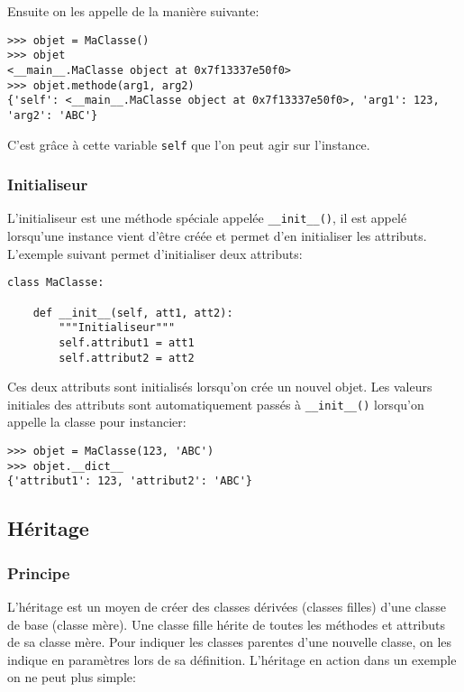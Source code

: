 Ensuite on les appelle de la manière suivante:
\begin{verbatim}
>>> objet = MaClasse()
>>> objet
<__main__.MaClasse object at 0x7f13337e50f0>
>>> objet.methode(arg1, arg2)
{'self': <__main__.MaClasse object at 0x7f13337e50f0>, 'arg1': 123, 'arg2': 'ABC'}
\end{verbatim}

C'est grâce à cette variable \texttt{self} que l'on peut agir sur l'instance.

\subsubsection{Initialiseur}

L'initialiseur est une méthode spéciale appelée \texttt{__init__()}, il est appelé lorsqu'une instance vient
d'être créée et permet d'en initialiser les attributs. L'exemple suivant permet d'initialiser deux attributs:

\begin{verbatim}
class MaClasse:

    def __init__(self, att1, att2):
        """Initialiseur"""
        self.attribut1 = att1
        self.attribut2 = att2
\end{verbatim}

Ces deux attributs sont initialisés lorsqu'on crée un nouvel objet. Les valeurs initiales des attributs sont automa\-tiquement 
passés à \texttt{__init__()} lorsqu'on appelle la classe pour instancier:

\begin{verbatim}
>>> objet = MaClasse(123, 'ABC')
>>> objet.__dict__
{'attribut1': 123, 'attribut2': 'ABC'}
\end{verbatim}

\subsection{Héritage}

\subsubsection{Principe}

L'héritage est un moyen de créer des classes dérivées (classes filles) d'une classe de base (classe mère). Une classe fille hérite de toutes les méthodes et attributs de sa classe mère. Pour indiquer les classes parentes d'une nouvelle classe, on
les indique en paramètres lors de sa définition. L'héritage en action dans un exemple on ne peut plus simple:

